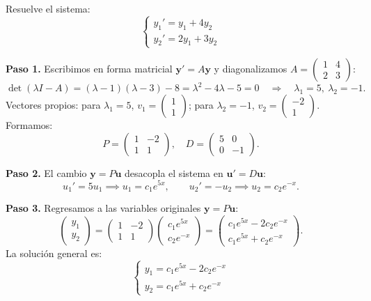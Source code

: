 \begin{example}
Resuelve el sistema:
\[
\begin{cases}
y_1' = y_1 + 4y_2 \\
y_2' = 2y_1 + 3y_2
\end{cases}
\]
\begin{myproof}
\textbf{Paso 1.} Escribimos en forma matricial $\mathbf{y}'=A\mathbf{y}$ y diagonalizamos $A = \begin{pmatrix} 1 & 4 \\ 2 & 3 \end{pmatrix}$:
\[
\det(\lambda I - A) = (\lambda-1)(\lambda-3)-8 = \lambda^2-4\lambda-5 = 0 \quad\Rightarrow\quad \lambda_1=5,\ \lambda_2=-1.
\]
Vectores propios: para $\lambda_1=5$, $v_1=\begin{pmatrix}1\\1\end{pmatrix}$; para $\lambda_2=-1$, $v_2=\begin{pmatrix}-2\\1\end{pmatrix}$. Formamos:
\[
P = \begin{pmatrix} 1 & -2 \\ 1 & 1 \end{pmatrix}, \quad D = \begin{pmatrix} 5 & 0 \\ 0 & -1 \end{pmatrix}.
\]

\textbf{Paso 2.} El cambio $\mathbf{y}=P\mathbf{u}$ desacopla el sistema en $\mathbf{u}'=D\mathbf{u}$:
\[
u_1' = 5u_1 \implies u_1 = c_1 e^{5x}, \qquad u_2' = -u_2 \implies u_2 = c_2 e^{-x}.
\]

\textbf{Paso 3.} Regresamos a las variables originales $\mathbf{y}=P\mathbf{u}$:
\[
\begin{pmatrix} y_1 \\ y_2 \end{pmatrix}
= \begin{pmatrix} 1 & -2 \\ 1 & 1 \end{pmatrix} \begin{pmatrix} c_1 e^{5x} \\ c_2 e^{-x} \end{pmatrix}
= \begin{pmatrix} c_1 e^{5x} - 2c_2 e^{-x} \\ c_1 e^{5x} + c_2 e^{-x} \end{pmatrix}.
\]
La solución general es:
\[
\boxed{
\begin{cases}
y_1 = c_1 e^{5x} - 2c_2 e^{-x} \\
y_2 = c_1 e^{5x} + c_2 e^{-x}
\end{cases}
}
\]
\end{myproof}
\end{example}

